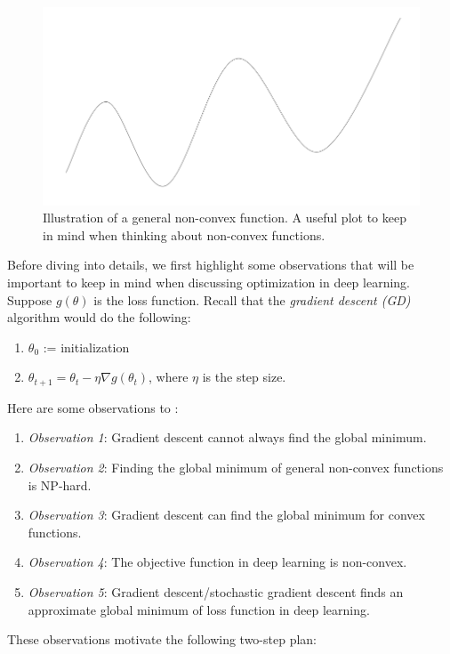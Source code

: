 \begin{figure}[H]
    \centering
    \includegraphics[scale = 0.3]{figures/smooth_func.png}
    \caption{Illustration of a general non-convex function. A useful plot to keep in mind when thinking about non-convex functions.}
    \label{lec10:fig:smooth_func}
\end{figure}
Before diving into details, we first highlight some observations that will be important to keep in mind when discussing optimization in deep learning. Suppose $g(\theta)$ is the loss function. Recall that the \textit{gradient descent (GD)} algorithm would do the following:
\begin{enumerate}
    \item $\theta_0$ := initialization
    \item $\theta_{t + 1} = \theta_t - \eta\nabla g(\theta_t)$, where $\eta$ is the step size.
\end{enumerate}
Here are some observations to :
\begin{enumerate}
    \item[] \textit{Observation 1}: Gradient descent cannot always find the global minimum.
    \item[] \textit{Observation 2}: Finding the global minimum of general non-convex functions is NP-hard.
    \item[] \textit{Observation 3}: Gradient descent can find the global minimum for convex functions.
    \item[] \textit{Observation 4}: The objective function in deep learning is non-convex.
    \item[] \textit{Observation 5}: Gradient descent/stochastic gradient descent finds an approximate global minimum of loss function in deep learning.
\end{enumerate}

These observations motivate the following two-step plan:

